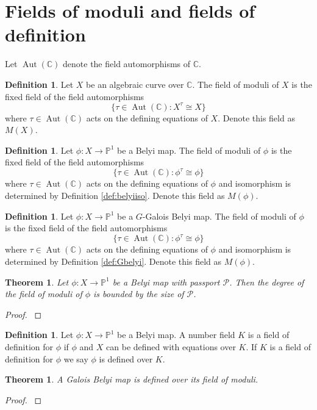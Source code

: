 \documentclass{dcthesis}
\newcommand{\PP}{\mathbb P}
\newcommand{\CC}{\mathbb C}
\newcommand{\defi}[1]{\textsf{#1}}
\DeclareMathOperator{\Aut}{Aut}
\numberwithin{equation}{section}
\newtheorem{theorem}[equation]{Theorem}
\theoremstyle{definition}
\newtheorem{definition}[equation]{Definition}
\theoremstyle{remark}
\begin{document}
{  \section{Fields of moduli and fields of definition}{\label{sec:fieldsofmodulifieldsofdefinition}
    Let $\Aut(\CC)$ denote the field automorphisms of $\CC$.
    \begin{definition}
      \label{def:fieldofmoduli}
      Let $X$ be an algebraic curve over $\CC$.
      The \defi{field of moduli} of $X$ is the fixed field of the
      field automorphisms
      \[
        \{\tau\in\Aut(\CC) : X^\tau\cong X\}
      \]
      where $\tau\in\Aut(\CC)$ acts on the defining equations of $X$.
      Denote this field as $M(X)$.
    \end{definition}
    \begin{definition}
      \label{def:fieldofmodulibelyimap}
      Let $\phi\colon X\to\PP^1$ be a Belyi map.
      The \defi{field of moduli} of $\phi$ is the fixed field of the
      field automorphisms
      \[
        \{\tau\in\Aut(\CC) : \phi^\tau\cong \phi\}
      \]
      where $\tau\in\Aut(\CC)$ acts on the defining equations of $\phi$
      and isomorphism is determined by
      Definition \ref{def:belyiiso}.
      Denote this field as $M(\phi)$.
    \end{definition}
    \begin{definition}
      \label{def:fieldofmoduliGbelyimap}
      Let $\phi\colon X\to\PP^1$ be a $G$-Galois Belyi map.
      The \defi{field of moduli} of $\phi$ is the fixed field of the
      field automorphisms
      \[
        \{\tau\in\Aut(\CC) : \phi^\tau\cong \phi\}
      \]
      where $\tau\in\Aut(\CC)$ acts on the defining equations of $\phi$
      and isomorphism is determined by
      Definition \ref{def:Gbelyi}.
      Denote this field as $M(\phi)$.
    \end{definition}
    \begin{theorem}\label{thm:fieldofmoduli}
      Let $\phi:X\to\PP^1$ be a Belyi map
      with passport $\mathcal{P}$.
      Then the degree of the field of moduli of $\phi$
      is bounded by the size of $\mathcal{P}$.
    \end{theorem}
    \begin{proof}
      \cite{SV}
    \end{proof}
    \begin{definition}
      \label{def:fieldofdefinition}
      Let $\phi\colon X\to\PP^1$ be a Belyi map.
      A number field $K$ is a
      \defi{field of definition} for $\phi$
      if $\phi$ and $X$ can be defined
      with equations over $K$.
      If $K$ is a field of definition for $\phi$
      we say $\phi$ is \defi{defined over} $K$.
    \end{definition}
    \begin{theorem}
      \label{thm:galoisbelyimapoverfieldofmoduli}
      A Galois Belyi map is defined over
      its field of moduli.
    \end{theorem}
    \begin{proof}
      \cite[Lemma 4.1]{triangles}
    \end{proof}
  }
}
\end{document}
